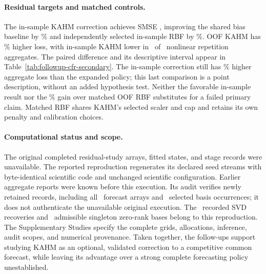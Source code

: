 \paragraph{Residual targets and matched controls.}
The in-sample KAHM correction achieves SMSE \CFRISLoss, improving the
shared bias baseline by \CFRISGainBias\% and independently selected
in-sample RBF by \CFRISGainRBF\%. OOF KAHM has
\CFROOFvsISPenalty\% higher loss, with in-sample KAHM lower in
\CFRISWinningRepetitions\ of \CFRRepetitions\ nonlinear repetition aggregates.
The paired difference and its descriptive interval appear in
Table~\ref{tab:followup-cfr-secondary}. The in-sample correction still
has \CFRISPolicyPenalty\% higher aggregate loss than the expanded
policy; this last comparison is a point description, without an added
hypothesis test. Neither the favorable in-sample result nor the
\CFRMatchedRBFGain\% gain over matched OOF RBF substitutes for a failed
primary claim. Matched RBF shares KAHM's selected scaler and cap and
retains its own penalty and calibration choices.

\begin{table}[t]
\centering\small
\caption{Prespecified secondary residual-target and matched comparisons,
nonlinear panel. Intervals are unadjusted descriptive paired-$t$ intervals
over the original \CFRRepetitions\ repetition units. A positive difference
means the left-hand candidate has higher loss. These comparisons remain
secondary regardless of their observed magnitude.}
\label{tab:followup-cfr-secondary}

\end{table}

\paragraph{Computational status and scope.}
The original completed residual-study arrays, fitted states, and stage
records were unavailable. The reported reproduction regenerates its
declared seed streams with byte-identical scientific code and unchanged
scientific configuration. Earlier aggregate reports were known before
this execution. Its audit verifies newly retained records, including
all \CFRAuditArrays\ forecast arrays and \CFRAuditBases\ selected basis
occurrences; it does not authenticate the unavailable original execution.
The \CFRSVDRecoveries\ recorded SVD recoveries and
\CFRZeroRanks\ admissible singleton zero-rank bases belong to this
reproduction. The Supplementary Studies specify the complete grids,
allocations, inference, audit scopes, and numerical provenance. Taken
together, the follow-ups support studying KAHM as an optional, validated
correction to a competitive common forecast, while leaving its advantage
over a strong complete forecasting policy unestablished.

